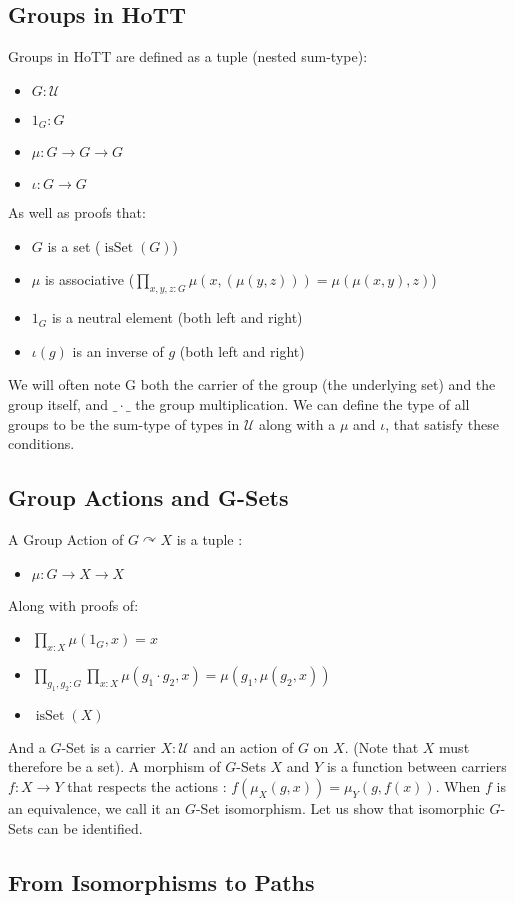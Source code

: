 \documentclass{article}
\DeclareMathOperator{\isset}{isSet}
\begin{document}
\subsection{Groups in HoTT}

Groups in HoTT are defined as a tuple (nested sum-type):

\begin{itemize}
    \item $G : \mathcal{U}$
    \item $1_{G} : G$
    \item $\mu : G \to G \to G$
    \item $\iota : G \to G$
\end{itemize}

As well as proofs that:

\begin{itemize}
    \item $G$ is a set ($\isset(G)$)
    \item $\mu$ is associative ($\prod_{x,y,z : G} \mu(x,(\mu(y,z))) = \mu(\mu(x,y),z)$)
    \item $1_{G}$ is a neutral element (both left and right)
    \item $\iota(g)$ is an inverse of $g$ (both left and right)
\end{itemize}

We will often note G both the carrier of the group (the underlying set) and the group itself, and $\_\cdot\_$ the group multiplication. We can define the type of all groups to be the sum-type of types in $\mathcal{U}$ along with a $\mu$ and $\iota$, that satisfy these conditions.

\subsection{Group Actions and G-Sets}

A Group Action of $G \curvearrowright X$ is a tuple :

\begin{itemize}
        \item $\mu : G \to X \to X$
\end{itemize}
Along with proofs of:
\begin{itemize}
        \item $\displaystyle\prod_{x : X} \mu(1_{G}, x) = x $
        \item $\displaystyle\prod_{g_1, g_2 : G}\prod_{x : X} \mu(g_1 \cdot g_2, x) = \mu(g_1, \mu(g_2,x)) $
        \item $\isset(X)$
\end{itemize}

And a $G$-Set is a carrier $X : \mathcal{U}$ and an action of $G$ on $X$. (Note that $X$ must therefore be a set). A morphism of $G$-Sets $X$ and $Y$ is a function between carriers $f : X \to Y$ that respects the actions : $f(\mu_{X}(g,x)) = \mu_{Y}(g,f(x))$. When $f$ is an equivalence, we call it an $G$-Set isomorphism. Let us show that isomorphic $G$-Sets can be identified.

\subsection{From Isomorphisms to Paths}
\end{document}

